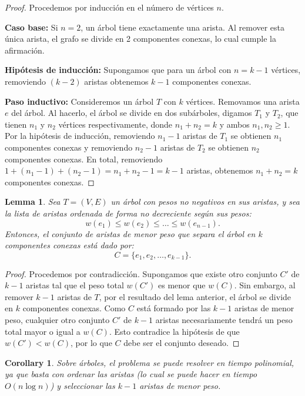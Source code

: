 \documentclass[12pt]{article}
\newtheorem{lemma}{Lemma}
\newtheorem{corollary}{Corollary}
\begin{document}
\begin{proof}
Procedemos por inducción en el número de vértices \( n \).

\textbf{Caso base:}  
Si \( n = 2 \), un árbol tiene exactamente una arista. Al remover esta única arista, el grafo se divide en 2 componentes conexas, lo cual cumple la afirmación.

\textbf{Hipótesis de inducción:}  
Supongamos que para un árbol con \( n = k-1 \) vértices, removiendo \( (k-2) \) aristas obtenemos \( k-1 \) componentes conexas.

\textbf{Paso inductivo:}  
Consideremos un árbol \( T \) con \( k \) vértices. Removamos una arista \( e \) del árbol. Al hacerlo, el árbol se divide en dos subárboles, digamos \( T_1 \) y \( T_2 \), que tienen \( n_1 \) y \( n_2 \) vértices respectivamente, donde \( n_1 + n_2 = k \) y ambos \( n_1, n_2 \ge 1 \).  
Por la hipótesis de inducción, removiendo \( n_1 - 1 \) aristas de \( T_1 \) se obtienen \( n_1 \) componentes conexas y removiendo \( n_2 - 1 \) aristas de \( T_2 \) se obtienen \( n_2 \) componentes conexas.  
En total, removiendo \( 1 + (n_1 - 1) + (n_2 - 1) = n_1 + n_2 - 1 = k - 1 \) aristas, obtenemos \( n_1 + n_2 = k \) componentes conexas.  
\end{proof}

\begin{lemma}
Sea \( T = (V, E) \) un árbol con pesos no negativos en sus aristas, y sea la lista de aristas ordenada de forma no decreciente según sus pesos:
\[
w(e_1) \le w(e_2) \le \dots \le w(e_{n-1}).
\]
Entonces, el conjunto de aristas de menor peso que separa el árbol en \( k \) componentes conexas está dado por:
\[
C = \{ e_1, e_2, \dots, e_{k-1} \}.
\]
\end{lemma}

\begin{proof}
Procedemos por contradicción. Supongamos que existe otro conjunto \( C' \) de \( k-1 \) aristas tal que el peso total \( w(C') \) es menor que \( w(C) \).  
Sin embargo, al remover \( k-1 \) aristas de \( T \), por el resultado del lema anterior, el árbol se divide en \( k \) componentes conexas.  
Como \( C \) está formado por las \( k-1 \) aristas de menor peso, cualquier otro conjunto \( C' \) de \( k-1 \) aristas necesariamente tendrá un peso total mayor o igual a \( w(C) \).  
Esto contradice la hipótesis de que \( w(C') < w(C) \), por lo que \( C \) debe ser el conjunto deseado.
\end{proof}

\begin{corollary}
Sobre árboles, el problema se puede resolver en tiempo polinomial, ya que basta con ordenar las aristas (lo cual se puede hacer en tiempo \( O(n \log n) \)) y seleccionar las \( k-1 \) aristas de menor peso.
\end{corollary}
\end{document}
